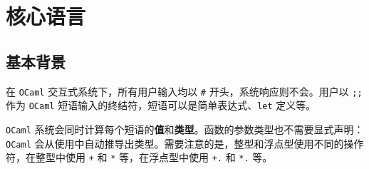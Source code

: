 \chapter{核心语言}

\section{基本背景}

在 \verb|OCaml| 交互式系统下，所有用户输入均以 \verb|#| 开头，系统响应则不会。用户以 \verb|;;| 作为 \verb|OCaml| 短语输入的终结符，短语可以是简单表达式、\verb|let| 定义等。

\verb|OCaml| 系统会同时计算每个短语的\textbf{值}和\textbf{类型}。函数的参数类型也不需要显式声明：\verb|OCaml| 会从使用中自动推导出类型。需要注意的是，整型和浮点型使用不同的操作符，在整型中使用 \verb|+| 和 \verb|*| 等，在浮点型中使用 \verb|+.| 和 \verb|*.| 等。
